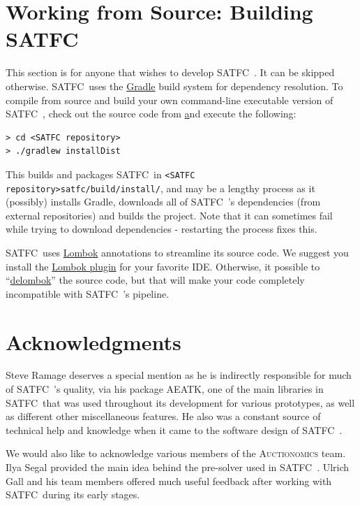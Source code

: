 \documentclass[
10pt, %
letterpaper, %
oneside, %
headinclude,footinclude, %
BCOR5mm, %
needspace, %
]{scrartcl}
\newcommand{\SATFC}{\textsc{SATFC}~}
\newcommand{\AEATK}{\textsc{AEATK}}
\begin{document}
\section{Working from Source: Building \SATFC}

This section is for anyone that wishes to develop \SATFC. It can be skipped otherwise. \SATFC uses the \href{http://www.gradle.org/}{Gradle} build system for dependency resolution. To compile from source and build your own command-line executable version of \SATFC, check out the source code from \href{https://github.com/FCC/SATFC} and execute the following:
\begin{lstlisting}[style=Bash]
> cd <SATFC repository>
> ./gradlew installDist
\end{lstlisting}
This builds and packages \SATFC in \texttt{<SATFC repository>satfc/build/install/}, and may be a lengthy process as it (possibly) installs Gradle, downloads all of \SATFC's dependencies (from external repositories) and builds the project. Note that it can sometimes fail while trying to download dependencies - restarting the process fixes this. 

\SATFC uses \href{http://projectlombok.org/}{Lombok} annotations to streamline its source code. We suggest you install the \href{http://projectlombok.org/download.html}{Lombok plugin} for your favorite IDE. Otherwise, it possible to ``\href{http://projectlombok.org/features/delombok.html}{delombok}'' the source code, but that will make your code completely incompatible with \SATFC's pipeline.

\section{Acknowledgments} 

Steve Ramage deserves a special mention as he is indirectly responsible for much of \SATFC's quality, via his package \AEATK, one of the main libraries in \SATFC that was used throughout its development for various prototypes, as well as different other miscellaneous features. He also was a constant source of technical help and knowledge when it came to the software design of \SATFC.

We would also like to acknowledge various members of the \textsc{Auctionomics} team. Ilya Segal provided the main idea behind the pre-solver used in \SATFC. Ulrich Gall and his team members offered much useful feedback after working with \SATFC during its early stages.
\end{document}
